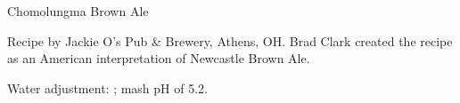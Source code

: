 \stylesection{\stylealternativesugarbeer}

\begin{recipe}{Chomolungma Brown Ale}

\begin{aboutblock}
Recipe by Jackie O's Pub \& Brewery, Athens, OH. Brad Clark created the recipe
as an American interpretation of Newcastle Brown Ale.
\end{aboutblock}


\begin{methodandtiming}
 
\begin{mashsteps}
\end{mashsteps}

\begin{fermentationsteps}
\end{fermentationsteps}

\begin{directions}
Water adjustment: ; mash pH of 5.2.
\end{directions}

\end{methodandtiming}

\recipebreak

\begin{ingredientsblock}

\begin{malts}
\end{malts}

\begin{hops}
\end{hops}


\end{ingredientsblock}

\end{recipe}
